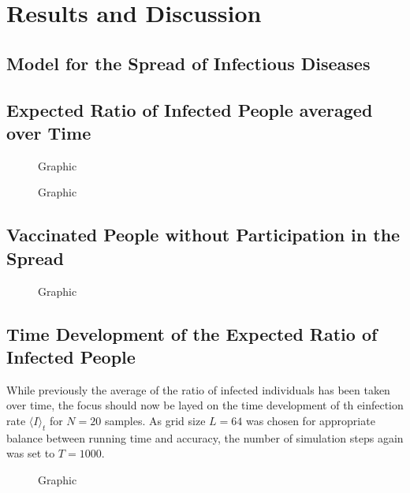 \section{Results and Discussion}

\subsection{Model for the Spread of Infectious Diseases}

\subsection{Expected Ratio of Infected People averaged over Time}


\begin{figure}[ht]
    \centering
    \resizebox{\textwidth}{!}{}
    \caption{Graphic}\label{fig:Res_Dis_Avg_Inf_over_p1}
\end{figure}


\begin{figure}[ht]
    \centering
    \resizebox{\textwidth}{!}{}
    \caption{Graphic}\label{fig:Res_Dis_Avg_Inf_over_p1_L96}
\end{figure}

\subsection{Vaccinated People without Participation in the Spread}

\begin{figure}[ht]
    \centering
    \resizebox{\textwidth}{!}{}
    \caption{Graphic}\label{fig:Res_Dis_Avg_Inf_over_p4}
\end{figure}

\subsection{Time Development of the Expected Ratio of Infected People}

While previously the average of the ratio of infected individuals has been taken over time, the focus should now be layed on the time development of th einfection rate $\langle I\rangle_t$ for $N=20$ samples.
As grid size $L=64$ was chosen for appropriate balance between running time and accuracy, the number of simulation steps again was set to $T=1000$.


\begin{figure}[ht]
    \centering
    \resizebox{\textwidth}{!}{}
    \caption{Graphic}\label{fig:Avg_Inf_over_t}
\end{figure}
